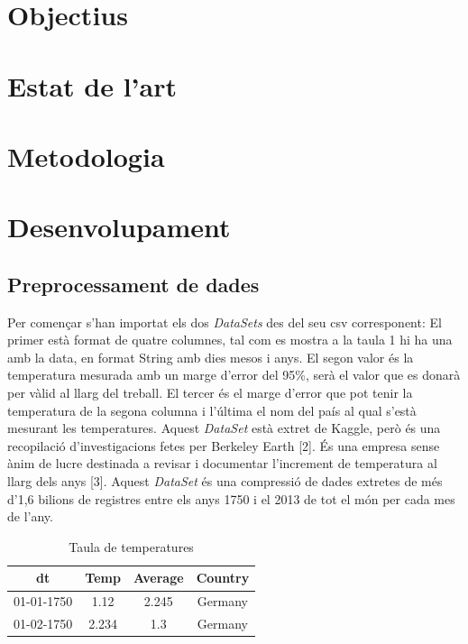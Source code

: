 \documentclass[10pt,a4paper,twocolumn,twoside]{article}
\begin{document}
\section{Objectius}

\section {Estat de l'art}

\section {Metodologia}

\section {Desenvolupament}
\subsection{Preprocessament de dades}
Per començar s'han importat els dos \textit{DataSets} des del seu csv corresponent:
El primer està format de quatre columnes, tal com es mostra a la taula 1 hi ha una amb la data, en format String amb dies mesos i anys. El segon valor és la temperatura mesurada amb un marge d'error del 95\%, serà el valor que es donarà per vàlid al llarg del treball. El tercer és el marge d'error que pot tenir la temperatura de la segona columna i l'última el nom del país al qual s'està mesurant les temperatures. Aquest \textit{DataSet} està extret de Kaggle, però és una recopilació d'investigacions fetes per Berkeley Earth [2]. És una empresa sense ànim de lucre destinada a revisar i documentar l'increment de temperatura al llarg dels anys [3]. Aquest \textit{DataSet} és una compressió de dades extretes de més d'1,6 bilions de registres entre els anys 1750 i el 2013 de tot el món per cada mes de l'any.
\begin{table}[ht]
\caption{Taula de temperatures}
\begin{center}
\begin{tabular}{c c c c} %
\hline\hline %
dt & Temp & Average & Country \\
\hline
01-01-1750 & 1.12 & 2.245 & Germany \\
01-02-1750 & 2.234 & 1.3 & Germany \\
\hline
\end{tabular}
\end{center}
\end{table}
\end{document}
